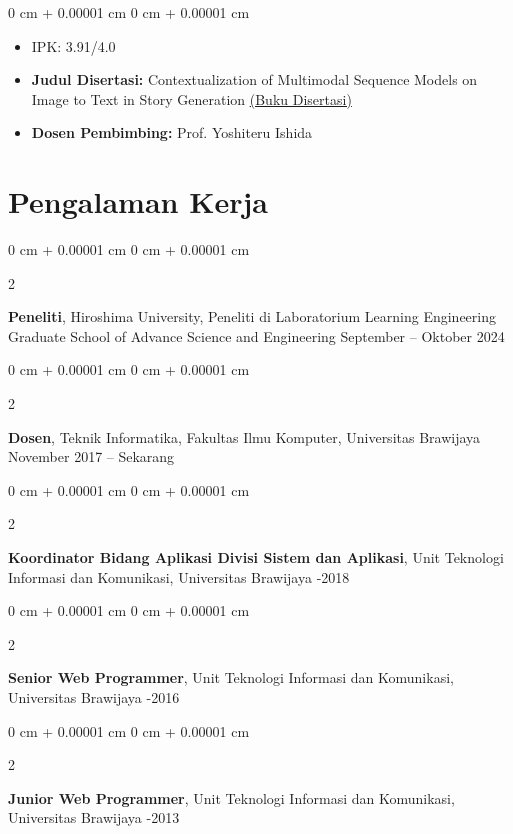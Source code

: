 \documentclass[10pt, letterpaper]{article}
\newenvironment{highlights}{
    \begin{itemize}[
        topsep=0.10 cm,
        parsep=0.10 cm,
        partopsep=0pt,
        itemsep=0pt,
        leftmargin=0 cm + 10pt
    ]
}{
    \end{itemize}
} %
\newenvironment{onecolentry}{
    \begin{adjustwidth}{
        0 cm + 0.00001 cm
    }{
        0 cm + 0.00001 cm
    }
}{
    \end{adjustwidth}
} %
\newenvironment{twocolentry}[2][]{
    \onecolentry
    \def\secondColumn{#2}
    \setcolumnwidth{\fill, 4.5 cm}
    \begin{paracol}{2}
}{
    \switchcolumn \raggedleft \secondColumn
    \end{paracol}
    \endonecolentry
} %
\begin{document}
        \vspace{0.10 cm}
        \begin{onecolentry}
            \begin{highlights}
                \item IPK: 3.91/4.0
                \item \textbf{Judul Disertasi:} Contextualization of Multimodal Sequence Models on Image to Text in Story Generation \href{https://repo.lib.tut.ac.jp/records/2227}{(Buku Disertasi)} 
                \item \textbf{Dosen Pembimbing:} Prof. Yoshiteru Ishida 
            \end{highlights}
        \end{onecolentry}
        


    \section{Pengalaman Kerja}
         \begin{twocolentry}{
            September – Oktober 2024
        }
            \textbf{Peneliti}, Hiroshima University, Peneliti di Laboratorium Learning Engineering Graduate School of Advance Science and Engineering\end{twocolentry}
        \vspace{0.3 cm}
        \begin{twocolentry}{
            November 2017 – Sekarang
        }
            \textbf{Dosen}, Teknik Informatika, Fakultas Ilmu Komputer, Universitas Brawijaya\end{twocolentry}
        \vspace{0.3 cm}
        \begin{twocolentry}{
            2016-2018
        }
            \textbf{Koordinator Bidang Aplikasi Divisi Sistem dan Aplikasi}, Unit Teknologi Informasi dan Komunikasi, Universitas Brawijaya\end{twocolentry}
        \vspace{0.3 cm}
        \begin{twocolentry}{
            2013-2016
        }
            \textbf{Senior Web Programmer}, Unit Teknologi Informasi dan Komunikasi, Universitas Brawijaya\end{twocolentry}
        \vspace{0.3 cm}
        \begin{twocolentry}{
            2011-2013
        }
            \textbf{Junior Web Programmer}, Unit Teknologi Informasi dan Komunikasi, Universitas Brawijaya\end{twocolentry}
\end{document}
